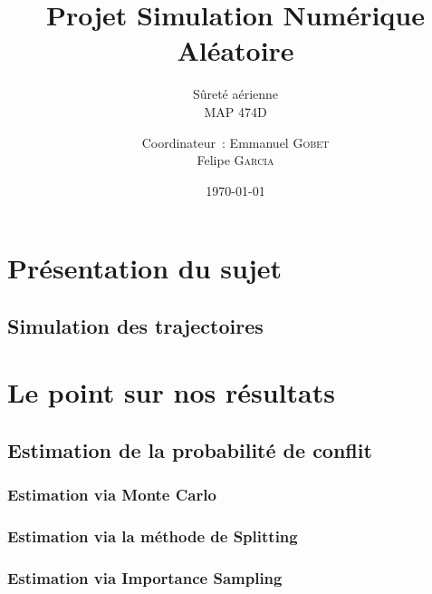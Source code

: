 \documentclass[a4paper, 12pt,twoside]{article}
\title{Projet Simulation Numérique Aléatoire}
\subtitle{Sûreté aérienne \\ MAP 474D}
\author{Coordinateur~: Emmanuel \textsc{Gobet} \\
        Felipe \textsc{Garcia} \\}
\date\today
\begin{document}
    \maketitle
    \renewcommand{\baselinestretch}{1.1}
    \setlength{\parskip}{0.5em}
    \tableofcontents
    \clearpage

    \section{Présentation du sujet}
	
	\subsection{Simulation des trajectoires} %
	\label{sub:simulation_des_trajectoires}
	
	
    \clearpage
    
    \section{Le point sur nos résultats}
    
    \subsection{Estimation de la probabilité de conflit}
	
	\subsubsection{Estimation via Monte Carlo} %
	\label{ssub:estimation_via_monte_carlo}
	
    
	\subsubsection{Estimation via la méthode de Splitting} %
	\label{ssub:estimation_via_la_methode_de_splitting}
	
	
	\subsubsection{Estimation via Importance Sampling} %
	\label{ssub:estimation_via_importance_sampling}
	
\end{document}
